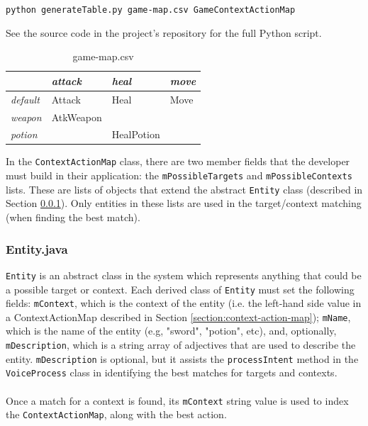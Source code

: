 \documentclass[11pt]{article}
\begin{document}
\begin{center}
\texttt{python generateTable.py game-map.csv GameContextActionMap}
\end{center}

See the source code in the project's repository for the full Python script.

\begin{table}[H]
\centering
\caption{game-map.csv}
\label{table:game-map-csv}
\begin{tabular}{l|l|l|l|}
\cline{1-4}
\multicolumn{1}{|l|}{\textbf{}} & \textit{attack}    & \textit{heal}  & \textit{move}    \\ \hline
\multicolumn{1}{|l|}{\textit{default}} & Attack    & Heal  & Move    \\ \hline
\multicolumn{1}{|l|}{\textit{weapon}}  & AtkWeapon &            &  \\ \hline
\multicolumn{1}{|l|}{\textit{potion}}  &                & HealPotion &              \\ \hline
\end{tabular}
\end{table}

In the \texttt{ContextActionMap} class, there are two member fields that the developer must build in their application: the \texttt{mPossibleTargets} and \texttt{mPossibleContexts} lists. These are lists of objects that extend the abstract \texttt{Entity} class (described in Section \ref{section:entity}). Only entities in these lists are used in the target/context matching (when finding the best match).

\subsubsection{Entity.java}
\label{section:entity}

\texttt{Entity} is an abstract class in the system which represents anything that could be a possible target or context. Each derived class of \texttt{Entity} must set the following fields: \texttt{mContext}, which is the context of the entity (i.e. the left-hand side value in a ContextActionMap described in Section \ref{section:context-action-map}); \texttt{mName}, which is the name of the entity (e.g, "sword", "potion", etc), and, optionally, \texttt{mDescription}, which is a string array of adjectives that are used to describe the entity. \texttt{mDescription} is optional, but it assists the \texttt{processIntent} method in the \texttt{VoiceProcess} class in identifying the best matches for targets and contexts.
\\
\\
Once a match for a context is found, its \texttt{mContext} string value is used to index the \texttt{ContextActionMap}, along with the best action.
\end{document}
